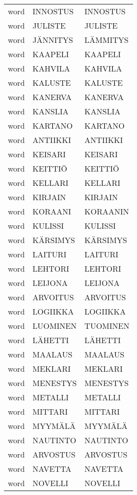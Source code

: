 \begin{supertabular}{lll}
 word &  INNOSTUS &       INNOSTUS \\
 word &   JULISTE &        JULISTE \\
 word &  JÄNNITYS &       LÄMMITYS \\
 word &   KAAPELI &        KAAPELI \\
 word &   KAHVILA &        KAHVILA \\
 word &   KALUSTE &        KALUSTE \\
 word &   KANERVA &        KANERVA \\
 word &   KANSLIA &        KANSLIA \\
 word &   KARTANO &        KARTANO \\
 word &  ANTIIKKI &       ANTIIKKI \\
 word &   KEISARI &        KEISARI \\
 word &   KEITTIÖ &        KEITTIÖ \\
 word &   KELLARI &        KELLARI \\
 word &   KIRJAIN &        KIRJAIN \\
 word &   KORAANI &       KORAANIN \\
 word &   KULISSI &        KULISSI \\
 word &  KÄRSIMYS &       KÄRSIMYS \\
 word &   LAITURI &        LAITURI \\
 word &   LEHTORI &        LEHTORI \\
 word &   LEIJONA &        LEIJONA \\
 word &  ARVOITUS &       ARVOITUS \\
 word &  LOGIIKKA &       LOGIIKKA \\
 word &  LUOMINEN &       TUOMINEN \\
 word &   LÄHETTI &        LÄHETTI \\
 word &   MAALAUS &        MAALAUS \\
 word &   MEKLARI &        MEKLARI \\
 word &  MENESTYS &       MENESTYS \\
 word &   METALLI &        METALLI \\
 word &   MITTARI &        MITTARI \\
 word &   MYYMÄLÄ &        MYYMÄLÄ \\
 word &  NAUTINTO &       NAUTINTO \\
 word &  ARVOSTUS &       ARVOSTUS \\
 word &   NAVETTA &        NAVETTA \\
 word &   NOVELLI &        NOVELLI \\

\end{supertabular}
